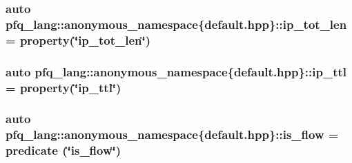 \hypertarget{namespacepfq__lang_1_1anonymous__namespace_02default_8hpp_03_a172d424ed5943dda09a80d7c63be9490}{
\subsubsection[{ip\-\_\-tot\-\_\-len}]{\setlength{\rightskip}{0pt plus 5cm}auto pfq\-\_\-lang\-::anonymous\-\_\-namespace\{default.\-hpp\}\-::ip\-\_\-tot\-\_\-len = {\bf property}(\char`\"{}ip\-\_\-tot\-\_\-len\char`\"{})}}\label{namespacepfq__lang_1_1anonymous__namespace_02default_8hpp_03_a172d424ed5943dda09a80d7c63be9490}
\hypertarget{namespacepfq__lang_1_1anonymous__namespace_02default_8hpp_03_a3fb042ff6cf76a1f01b4e97e35b30507}{
\subsubsection[{ip\-\_\-ttl}]{\setlength{\rightskip}{0pt plus 5cm}auto pfq\-\_\-lang\-::anonymous\-\_\-namespace\{default.\-hpp\}\-::ip\-\_\-ttl = {\bf property}(\char`\"{}ip\-\_\-ttl\char`\"{})}}\label{namespacepfq__lang_1_1anonymous__namespace_02default_8hpp_03_a3fb042ff6cf76a1f01b4e97e35b30507}
\hypertarget{namespacepfq__lang_1_1anonymous__namespace_02default_8hpp_03_a32aab6804e2daac2458f7c050ed69cf1}{
\subsubsection[{is\-\_\-flow}]{\setlength{\rightskip}{0pt plus 5cm}auto pfq\-\_\-lang\-::anonymous\-\_\-namespace\{default.\-hpp\}\-::is\-\_\-flow = {\bf predicate} (\char`\"{}is\-\_\-flow\char`\"{})}}\label{namespacepfq__lang_1_1anonymous__namespace_02default_8hpp_03_a32aab6804e2daac2458f7c050ed69cf1}
